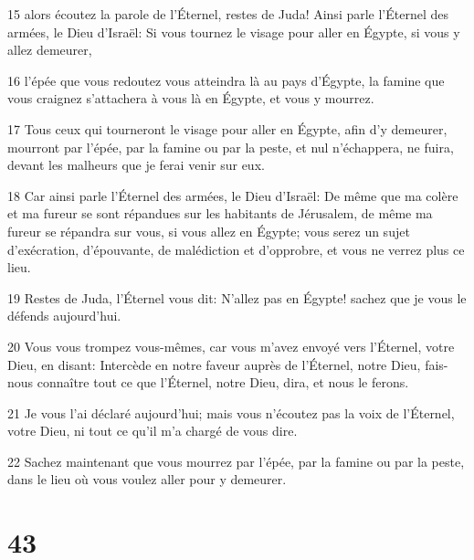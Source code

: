 \par 15 alors écoutez la parole de l'Éternel, restes de Juda! Ainsi parle l'Éternel des armées, le Dieu d'Israël: Si vous tournez le visage pour aller en Égypte, si vous y allez demeurer,
\par 16 l'épée que vous redoutez vous atteindra là au pays d'Égypte, la famine que vous craignez s'attachera à vous là en Égypte, et vous y mourrez.
\par 17 Tous ceux qui tourneront le visage pour aller en Égypte, afin d'y demeurer, mourront par l'épée, par la famine ou par la peste, et nul n'échappera, ne fuira, devant les malheurs que je ferai venir sur eux.
\par 18 Car ainsi parle l'Éternel des armées, le Dieu d'Israël: De même que ma colère et ma fureur se sont répandues sur les habitants de Jérusalem, de même ma fureur se répandra sur vous, si vous allez en Égypte; vous serez un sujet d'exécration, d'épouvante, de malédiction et d'opprobre, et vous ne verrez plus ce lieu.
\par 19 Restes de Juda, l'Éternel vous dit: N'allez pas en Égypte! sachez que je vous le défends aujourd'hui.
\par 20 Vous vous trompez vous-mêmes, car vous m'avez envoyé vers l'Éternel, votre Dieu, en disant: Intercède en notre faveur auprès de l'Éternel, notre Dieu, fais-nous connaître tout ce que l'Éternel, notre Dieu, dira, et nous le ferons.
\par 21 Je vous l'ai déclaré aujourd'hui; mais vous n'écoutez pas la voix de l'Éternel, votre Dieu, ni tout ce qu'il m'a chargé de vous dire.
\par 22 Sachez maintenant que vous mourrez par l'épée, par la famine ou par la peste, dans le lieu où vous voulez aller pour y demeurer.

\chapter{43}

